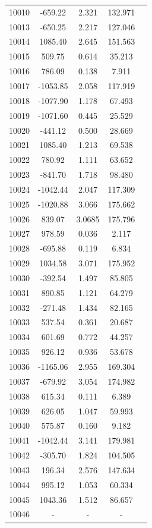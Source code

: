 {\begin{longtable}{ccccc}
10010 & -659.22 & 2.321 & 132.971\\
10013 & -650.25 & 2.217 & 127.046\\
10014 & 1085.40 & 2.645 & 151.563\\
10015 & 509.75 & 0.614 & 35.213\\
10016 & 786.09 & 0.138 & 7.911\\
10017 & -1053.85 & 2.058 & 117.919\\
10018 & -1077.90 & 1.178 & 67.493\\
10019 & -1071.60 & 0.445 & 25.529\\
10020 & -441.12 & 0.500 & 28.669\\
10021 & 1085.40 & 1.213 & 69.538\\
10022 & 780.92 & 1.111 & 63.652\\
10023 & -841.70 & 1.718 & 98.480\\
10024 & -1042.44 & 2.047 & 117.309\\
10025 & -1020.88 & 3.066 & 175.662\\
10026 & 839.07 & 3.0685 & 175.796\\
10027 & 978.59 & 0.036 & 2.117\\
10028 & -695.88 & 0.119 & 6.834\\
10029 & 1034.58 & 3.071 & 175.952\\
10030 & -392.54 & 1.497 & 85.805\\
10031 & 890.85 & 1.121 & 64.279\\
10032 & -271.48 & 1.434 & 82.165\\
10033 & 537.54 & 0.361 & 20.687\\
10034 & 601.69 & 0.772 & 44.257\\
10035 & 926.12 & 0.936 & 53.678\\
10036 & -1165.06 & 2.955 & 169.304\\
10037 & -679.92 & 3.054 & 174.982\\
10038 & 615.34 & 0.111 & 6.389\\
10039 & 626.05 & 1.047 & 59.993\\
10040 & 575.87 & 0.160 & 9.182\\
10041 & -1042.44 & 3.141 & 179.981\\
10042 & -305.70 & 1.824 & 104.505\\
10043 & 196.34 & 2.576 & 147.634\\
10044 & 995.12 & 1.053 & 60.334\\
10045 & 1043.36 & 1.512 & 86.657\\
10046 & - & - & - \\

\end{longtable}}
